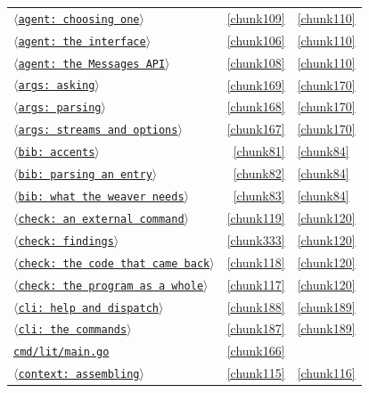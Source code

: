 \documentclass[10pt,a4paper]{article}
\newcounter{chunk}
\newcommand{\chunkname}[1]{\ensuremath{\langle}\texttt{#1}\ensuremath{\rangle}}
\begin{document}
\begin{longtable}{@{}p{}rp{}@{}}
\hyperref[chunk109]{\chunkname{agent: choosing one}} & \ref*{chunk109} & \hyperref[chunk110]{\ref*{chunk110}} \\
\hyperref[chunk106]{\chunkname{agent: the interface}} & \ref*{chunk106} & \hyperref[chunk110]{\ref*{chunk110}} \\
\hyperref[chunk108]{\chunkname{agent: the Messages API}} & \ref*{chunk108} & \hyperref[chunk110]{\ref*{chunk110}} \\
\hyperref[chunk169]{\chunkname{args: asking}} & \ref*{chunk169} & \hyperref[chunk170]{\ref*{chunk170}} \\
\hyperref[chunk168]{\chunkname{args: parsing}} & \ref*{chunk168} & \hyperref[chunk170]{\ref*{chunk170}} \\
\hyperref[chunk167]{\chunkname{args: streams and options}} & \ref*{chunk167} & \hyperref[chunk170]{\ref*{chunk170}} \\
\hyperref[chunk81]{\chunkname{bib: accents}} & \ref*{chunk81} & \hyperref[chunk84]{\ref*{chunk84}} \\
\hyperref[chunk82]{\chunkname{bib: parsing an entry}} & \ref*{chunk82} & \hyperref[chunk84]{\ref*{chunk84}} \\
\hyperref[chunk83]{\chunkname{bib: what the weaver needs}} & \ref*{chunk83} & \hyperref[chunk84]{\ref*{chunk84}} \\
\hyperref[chunk119]{\chunkname{check: an external command}} & \ref*{chunk119} & \hyperref[chunk120]{\ref*{chunk120}} \\
\hyperref[chunk333]{\chunkname{check: findings}} & \ref*{chunk333} & \hyperref[chunk120]{\ref*{chunk120}} \\
\hyperref[chunk118]{\chunkname{check: the code that came back}} & \ref*{chunk118} & \hyperref[chunk120]{\ref*{chunk120}} \\
\hyperref[chunk117]{\chunkname{check: the program as a whole}} & \ref*{chunk117} & \hyperref[chunk120]{\ref*{chunk120}} \\
\hyperref[chunk188]{\chunkname{cli: help and dispatch}} & \ref*{chunk188} & \hyperref[chunk189]{\ref*{chunk189}} \\
\hyperref[chunk187]{\chunkname{cli: the commands}} & \ref*{chunk187} & \hyperref[chunk189]{\ref*{chunk189}} \\
\hyperref[chunk166]{\texttt{cmd/\allowbreak{}lit/\allowbreak{}main.\allowbreak{}go}} & \ref*{chunk166} &  \\
\hyperref[chunk115]{\chunkname{context: assembling}} & \ref*{chunk115} & \hyperref[chunk116]{\ref*{chunk116}} \\

\end{longtable}
\end{document}
